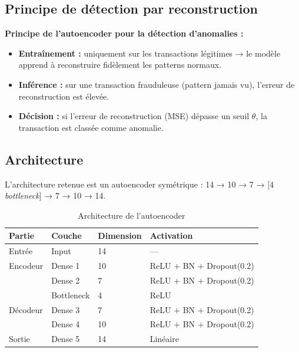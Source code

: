 \documentclass[12pt,a4paper,twoside]{report}
\begin{document}
\subsection{Principe de détection par reconstruction}

\begin{definitionbox}
\textbf{Principe de l'autoencoder pour la détection d'anomalies :}
\begin{itemize}
  \item \textbf{Entraînement :} uniquement sur les transactions légitimes → le modèle apprend à reconstruire fidèlement les patterns normaux.
  \item \textbf{Inférence :} sur une transaction frauduleuse (pattern jamais vu), l'erreur de reconstruction est élevée.
  \item \textbf{Décision :} si l'erreur de reconstruction (MSE) dépasse un seuil $\theta$, la transaction est classée comme anomalie.
\end{itemize}
\end{definitionbox}

\subsection{Architecture}

L'architecture retenue est un autoencoder symétrique : 14 → 10 → 7 → [4 \textit{bottleneck}] → 7 → 10 → 14.

\begin{table}[H]
\centering
\caption{Architecture de l'autoencoder}
\label{tab:ae_architecture}
\begin{tabular}{llll}
\toprule
\textbf{Partie} & \textbf{Couche} & \textbf{Dimension} & \textbf{Activation} \\
\midrule
Entrée   & Input      & 14 & --- \\
Encodeur & Dense 1    & 10 & ReLU + BN + Dropout(0.2) \\
         & Dense 2    & 7  & ReLU + BN + Dropout(0.2) \\
         & Bottleneck & 4  & ReLU \\
Décodeur & Dense 3    & 7  & ReLU + BN + Dropout(0.2) \\
         & Dense 4    & 10 & ReLU + BN + Dropout(0.2) \\
Sortie   & Dense 5    & 14 & Linéaire \\
\bottomrule
\end{tabular}
\end{table}
\end{document}
